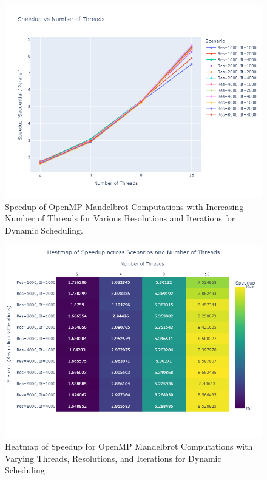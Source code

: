 \documentclass[
	report, %
	11pt, %
]{CSUniSchoolLabReport}
\begin{document}
\begin{figure}[H]
	\centering
	\captionsetup{justification=centering, width=.8\linewidth}
	\includegraphics[width=\textwidth]{./img/mandelbrot_openmp_best_speedup_vs_threads.png}
	\caption{Speedup of OpenMP Mandelbrot Computations with Increasing Number of Threads for Various Resolutions and Iterations for Dynamic Scheduling.}
	\label{fig:mandelbrot_openMP_best_speedup_vs_threads}
\end{figure}

\begin{figure}[H]
	\centering
	\captionsetup{justification=centering, width=.8\linewidth}
	\includegraphics[width=\textwidth]{./img/mandelbrot_openmp_best_speedup_vs_threads_heatmap.png}
	\caption{Heatmap of Speedup for OpenMP Mandelbrot Computations with Varying Threads, Resolutions, and Iterations for Dynamic Scheduling.}
	\label{fig:mandelbrot_openMP_best_speedup_vs_threads_heatmap}
\end{figure}
\end{document}
